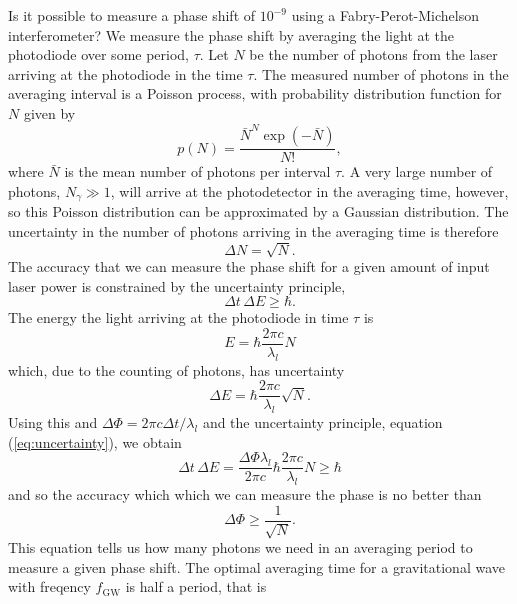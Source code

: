 Is it possible to measure a phase shift of $10^{-9}$ using a
Fabry-Perot-Michelson interferometer? We measure the phase shift by averaging
the light at the photodiode over some period, $\tau$. Let $N$ be the number of
photons from the laser arriving at the photodiode in the time $\tau$. The
measured number of photons in the averaging interval is a Poisson process,
with probability distribution function for $N$ given by
\begin{equation}
p(N) = \frac{ \bar{N} ^{N} \exp \left(-\bar{N}\right) } {N!},
\end{equation}
where $\bar{N}$ is the mean number of photons per interval $\tau$. A very
large number of photons, $N_\gamma \gg 1$, will arrive at the photodetector in
the averaging time, however, so this Poisson distribution can be approximated
by a Gaussian distribution. The uncertainty in the number of photons arriving in the
averaging time is therefore
\begin{equation}
\Delta N = \sqrt{N}.
\end{equation}
The accuracy that we can measure the phase shift for a given amount of input
laser power is constrained by the uncertainty principle,
\begin{equation}
\Delta t \, \Delta E \ge \hbar.
\label{eq:uncertainty}
\end{equation}
The energy the light arriving at the photodiode in time $\tau$ is
\begin{equation}
E = \hbar \frac{2\pi c}{\lambda_l} N
\end{equation}
which, due to the counting of photons, has uncertainty 
\begin{equation}
\Delta E = \hbar \frac{2\pi c}{\lambda_l} \sqrt{N}.
\label{eq:uncertdeltae}
\end{equation}
Using this and $\Delta\Phi = 2\pi c \Delta t / \lambda_l$ and the uncertainty
principle, equation (\ref{eq:uncertainty}), we obtain
\begin{equation}
\Delta t \, \Delta E = \frac{\Delta \Phi \lambda_l}{2\pi c} \hbar \frac{2\pi
c}{\lambda_l} N \ge \hbar
\end{equation}
and so the accuracy which which we can measure the phase is no better than
\begin{equation}
\Delta \Phi \ge \frac{1}{\sqrt{N}}.
\end{equation}
This equation tells us how many photons we need in an averaging period to
measure a given phase shift. The optimal averaging time for a gravitational
wave with freqency $f_\mathrm{GW}$ is half a period, that is
